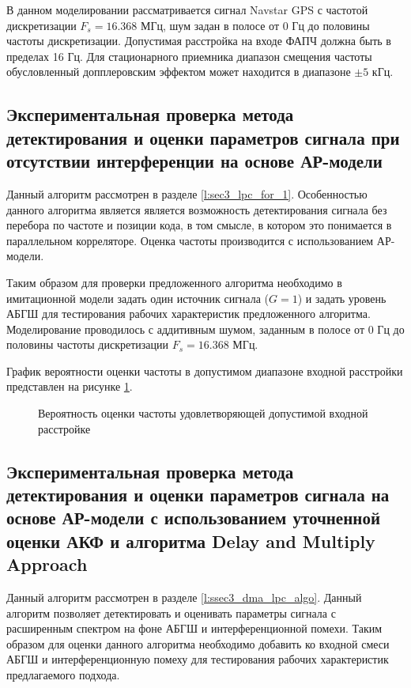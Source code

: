 В данном моделировании рассматривается сигнал Navstar GPS с частотой дискретизации ${F_s=16.368}$ МГц, шум задан в полосе от 0 Гц
до половины частоты дискретизации. Допустимая расстройка на входе ФАПЧ должна быть в пределах 16 Гц. 
Для стационарного приемника диапазон смещения частоты обусловленный допплеровским эффектом \cite{tsui} может находится в диапазоне ${\pm 5}$ кГц.

\subsection{Экспериментальная проверка метода детектирования и оценки параметров сигнала при отсутствии интерференции на основе АР-модели}

Данный алгоритм рассмотрен в разделе \ref{l:sec3_lpc_for_1}. Особенностью данного алгоритма является является возможность детектирования сигнала
без перебора по частоте и позиции кода, в том смысле, в котором это понимается в параллельном корреляторе. Оценка частоты производится с
использованием АР-модели.

Таким образом для проверки предложенного алгоритма необходимо в имитационной модели задать один источник сигнала (${G=1}$) и задать уровень АБГШ для
тестирования рабочих характеристик предложенного алгоритма. Моделирование проводилось с аддитивным шумом, заданным в полосе от 0 Гц до
половины частоты дискретизации ${F_s=16.368}$ МГц.

График вероятности оценки частоты в допустимом диапазоне входной расстройки представлен на рисунке
\ref{pic:lpc_for_1_probability}. 
\begin{figure}[H]
\center{}
	\caption{Вероятность оценки частоты удовлетворяющей допустимой входной расстройке}
	\label{pic:lpc_for_1_probability}
\end{figure}

\subsection{Экспериментальная проверка метода детектирования и оценки параметров сигнала на основе АР-модели с использованием уточненной оценки АКФ
	и алгоритма Delay and Multiply Approach}

Данный алгоритм рассмотрен в разделе \ref{l:ssec3_dma_lpc_algo}. Данный алгоритм позволяет детектировать и оценивать параметры сигнала с расширенным спектром
на фоне АБГШ и интерференционной помехи. Таким образом для оценки данного алгоритма необходимо добавить ко входной смеси АБГШ и интерференционную помеху
для тестирования рабочих характеристик предлагаемого подхода.

